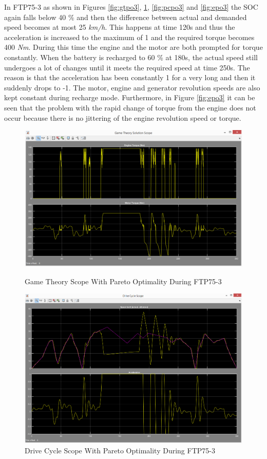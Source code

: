 In FTP75-3 as shown in Figures \ref{fig:gtpo3}, \ref{fig:dcpo3}, \ref{fig:pcpo3} and \ref{fig:epo3} the SOC again falls below 40 \% and then the difference between actual and demanded speed becomes at most 25 \textit{km/h}. This happens at time 120s and thus the acceleration is increased to the maximum of 1 and the required torque becomes 400 \textit{Nm}. During this time the engine and the motor are both prompted for torque constantly. When the battery is recharged to 60 \% at 180s, the actual speed still undergoes a lot of changes until it meets the required speed at time 250s. The reason is that the acceleration has been constantly 1 for a very long and then it suddenly drops to -1. The motor, engine and generator revolution speeds are also kept constant during recharge mode. Furthermore, in Figure \ref{fig:epo3} it can be seen that the problem with the rapid change of torque from the engine does not occur because there is no jittering of the engine revolution speed or torque.

\begin{figure}[hp]
\centering
\includegraphics[scale=0.48]{figures/Pareto/FTP75-3/gameTheory08Juni}
\caption{Game Theory Scope With Pareto Optimality During FTP75-3}
\label{fig:gtpo3}
\includegraphics[scale=0.43]{figures/Pareto/FTP75-3/driveCycle08Juni}
\caption{Drive Cycle Scope With Pareto Optimality During FTP75-3}
\label{fig:dcpo3}
\end{figure}

